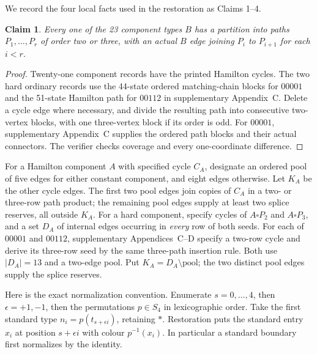 \documentclass[11pt]{article}
\newtheorem{claim}{Claim}
\theoremstyle{remark}
\numberwithin{equation}{section}
\numberwithin{table}{section}
\begin{document}
We record the four local facts used in the restoration as Claims 1--4.

\begin{claim}\label{lem:pentagon-path-blocks}
Every one of the 23 component types $B$ has a partition into paths
$P_1,\ldots,P_r$ of order two or three, with an actual $B$ edge
joining $P_i$ to $P_{i+1}$ for each $i<r$.
\end{claim}
\begin{proof}
Twenty-one component records have the printed Hamilton cycles. The two
hard ordinary records use the 44-state ordered matching-chain blocks for
$00001$ and the 51-state Hamilton path for $00112$ in supplementary
Appendix~C.
Delete a cycle edge where necessary, and divide the resulting path
into consecutive two-vertex blocks, with one three-vertex block if
its order is odd. For $00001$, supplementary Appendix~C supplies the ordered path blocks and their actual connectors.  The verifier checks coverage and every one-coordinate difference.
\end{proof}

For a Hamilton component $A$ with specified cycle $C_A$, designate an
ordered pool of five edges for either constant component, and eight
edges otherwise. Let $K_A$ be the other cycle edges. The first two
pool edges join copies of $C_A$ in a two- or three-row path product;
the remaining pool edges supply at least two splice reserves, all
outside $K_A$.
For a hard component, specify cycles of $A\square P_2$ and
$A\square P_3$, and a set $D_A$ of internal edges occurring in
\emph{every} row of both seeds. For each of $00001$ and $00112$,
supplementary Appendices~C--D specify a two-row cycle and derive its three-row
seed by the same three-path insertion rule. Both use $|D_A|=13$
and a two-edge pool. Put $K_A=D_A\setminus\text{pool}$; the two
distinct pool edges supply the splice reserves.

Here is the exact normalization convention. Enumerate $s=0,\ldots,4$,
then $\epsilon=+1,-1$, then the permutations $p\in S_4$ in lexicographic
order. Take the first standard type
$n_i=p(t_{s+\epsilon i})$, retaining $\ast$. Restoration puts the
standard entry $x_i$ at position $s+\epsilon i$ with colour $p^{-1}(x_i)$.
In particular a standard boundary first normalizes by the identity.
\end{document}
